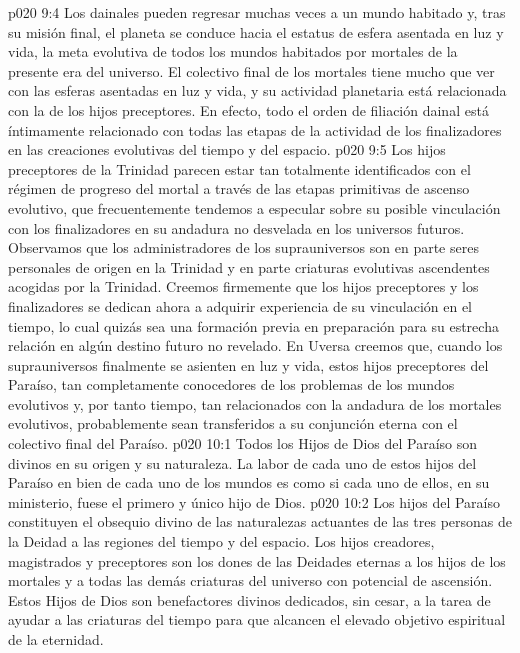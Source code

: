 \vs p020 9:4 Los dainales pueden regresar muchas veces a un mundo habitado y, tras su misión final, el planeta se conduce hacia el estatus de esfera asentada en luz y vida, la meta evolutiva de todos los mundos habitados por mortales de la presente era del universo. El colectivo final de los mortales tiene mucho que ver con las esferas asentadas en luz y vida, y su actividad planetaria está relacionada con la de los hijos preceptores. En efecto, todo el orden de filiación dainal está íntimamente relacionado con todas las etapas de la actividad de los finalizadores en las creaciones evolutivas del tiempo y del espacio.
\vs p020 9:5 \pc Los hijos preceptores de la Trinidad parecen estar tan totalmente identificados con el régimen de progreso del mortal a través de las etapas primitivas de ascenso evolutivo, que frecuentemente tendemos a especular sobre su posible vinculación con los finalizadores en su andadura no desvelada en los universos futuros. Observamos que los administradores de los suprauniversos son en parte seres personales de origen en la Trinidad y en parte criaturas evolutivas ascendentes acogidas por la Trinidad. Creemos firmemente que los hijos preceptores y los finalizadores se dedican ahora a adquirir experiencia de su vinculación en el tiempo, lo cual quizás sea una formación previa en preparación para su estrecha relación en algún destino futuro no revelado. En Uversa creemos que, cuando los suprauniversos finalmente se asienten en luz y vida, estos hijos preceptores del Paraíso, tan completamente conocedores de los problemas de los mundos evolutivos y, por tanto tiempo, tan relacionados con la andadura de los mortales evolutivos, probablemente sean transferidos a su conjunción eterna con el colectivo final del Paraíso.
\vs p020 10:1 Todos los Hijos de Dios del Paraíso son divinos en su origen y su naturaleza. La labor de cada uno de estos hijos del Paraíso en bien de cada uno de los mundos es como si cada uno de ellos, en su ministerio, fuese el primero y único hijo de Dios.
\vs p020 10:2 Los hijos del Paraíso constituyen el obsequio divino de las naturalezas actuantes de las tres personas de la Deidad a las regiones del tiempo y del espacio. Los hijos creadores, magistrados y preceptores son los dones de las Deidades eternas a los hijos de los mortales y a todas las demás criaturas del universo con potencial de ascensión. Estos Hijos de Dios son benefactores divinos dedicados, sin cesar, a la tarea de ayudar a las criaturas del tiempo para que alcancen el elevado objetivo espiritual de la eternidad.
